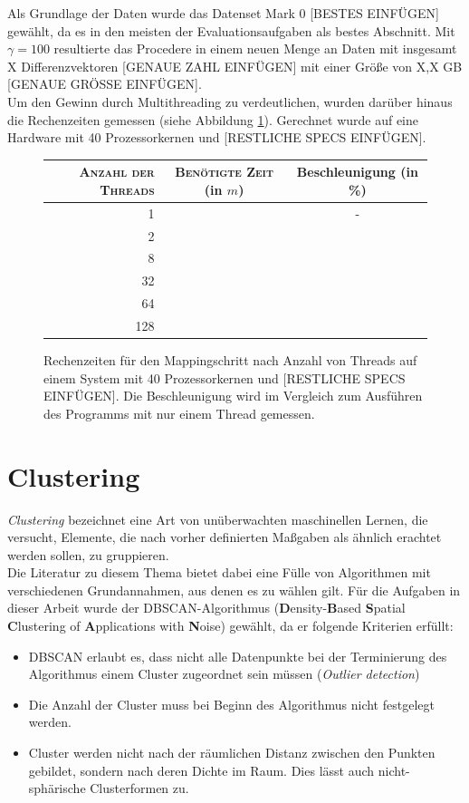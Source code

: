 Als Grundlage der Daten wurde das Datenset Mark 0 [BESTES EINFÜGEN] gewählt, da es in den meisten der Evaluationsaufgaben
als bestes Abschnitt. Mit $\gamma = 100$ resultierte das Procedere in einem neuen Menge an Daten mit insgesamt
X Differenzvektoren [GENAUE ZAHL EINFÜGEN] mit einer Größe von X,X GB [GENAUE GRÖSSE EINFÜGEN].\\
Um den Gewinn durch Multithreading zu verdeutlichen, wurden darüber hinaus die Rechenzeiten gemessen (siehe Abbildung \ref{fig:times}).
Gerechnet wurde auf eine Hardware mit 40 Prozessorkernen und [RESTLICHE SPECS EINFÜGEN].

\begin{figure}[h]
  \centering
  \begin{tabular}{r|cc}
    \textsc{Anzahl der Threads} & \textsc{Benötigte Zeit} (in $m$) & Beschleunigung (in \%) \\
    \hline
    1 & & - \\
    2 & & \\
    8 & & \\
    32 & & \\
    64 & & \\
    128 & & \\
  \end{tabular}
  \caption[Rechenzeiten für den Mappingschritt nach Anzahl von Threads]{Rechenzeiten für den Mappingschritt nach Anzahl von Threads auf
  einem System mit 40 Prozessorkernen und [RESTLICHE SPECS EINFÜGEN]. Die Beschleunigung wird im Vergleich zum Ausführen des Programms
  mit nur einem Thread gemessen.\label{fig:times}}
\end{figure}

\section{Clustering}

\emph{Clustering} bezeichnet eine Art von unüberwachten maschinellen Lernen,
die versucht, Elemente, die nach vorher definierten Maßgaben als ähnlich erachtet
werden sollen, zu gruppieren.\\
Die Literatur zu diesem Thema bietet dabei eine Fülle von Algorithmen mit verschiedenen
Grundannahmen, aus denen es zu wählen gilt. Für die Aufgaben in dieser Arbeit wurde
der DBSCAN-Algorithmus (\textbf{D}ensity-\textbf{B}ased \textbf{S}patial \textbf{C}lustering of
\textbf{A}pplications with \textbf{N}oise) gewählt, da er folgende Kriterien erfüllt:
\begin{itemize}
  \item DBSCAN erlaubt es, dass nicht alle Datenpunkte bei der
  Terminierung des Algorithmus einem Cluster zugeordnet sein müssen (\emph{Outlier detection})
  \item Die Anzahl der Cluster muss bei Beginn des Algorithmus nicht festgelegt werden.
  \item Cluster werden nicht nach der räumlichen Distanz zwischen den Punkten gebildet, sondern nach deren
  Dichte im Raum. Dies lässt auch nicht-sphärische Clusterformen zu.
\end{itemize}


